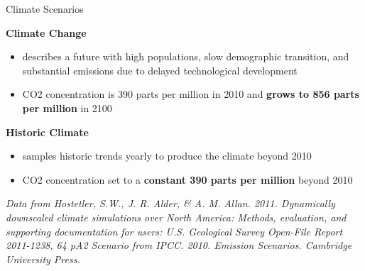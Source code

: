 \documentclass[xcolor=dvipsnames]{beamer}
\begin{document}
\begin{frame}{Climate Scenarios}

		 \textbf{\color{climateChange}Climate Change }
			\begin{itemize}
				\item<a2@1-> describes a future with high populations, slow demographic transition, and substantial emissions due to delayed technological development
                \item<a2@1-> CO2 concentration is 390 parts per million in 2010 and \textbf{grows to 856 parts per million} in 2100
			\end{itemize}
            \vspace*{.75cm}
          \textbf{\color{recentTrends}Historic Climate} 
			\begin{itemize}
				\item<rt@1-> samples historic trends yearly to produce the climate beyond 2010
                \item<rt@1-> CO2 concentration set to a \textbf{constant 390 parts per million} beyond 2010 
			\end{itemize}
            
            


\vfill

\scriptsize{\textit{Data from Hostetler, S.W., J. R. Alder, \& A. M. Allan. 2011. Dynamically downscaled climate simulations over North America: Methods, evaluation, and supporting documentation for users: U.S. Geological Survey Open-File Report 2011-1238, 64 p\newline A2 Scenario from IPCC. 2010. Emission Scenarios. Cambridge University Press.}}
\end{frame}
\end{document}
